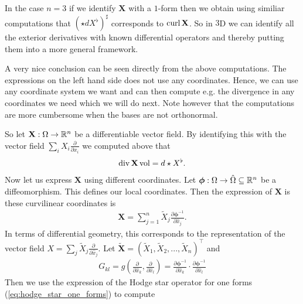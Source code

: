 \documentclass[../master_thesis.tex]{subfiles}
\begin{document}
In the case $n=3$ if we identify $\mathbf{X}$ with a $1$-form then 
we obtain using similiar computations
that $(\star d X^\flat)^\sharp$ corresponds to  $\mathbf{\operatorname{curl}} \,\mathbf{X}$.
So in $3$D we can identify all the exterior derivatives with known differential
operators and thereby putting them into a more general framework.

A very nice conclusion can be seen directly from the above computations. The 
expressions on the left hand side does not use any coordinates. Hence, 
we can use any coordinate system we want and can then compute e.g. the 
divergence in any coordinates we need which we will do next. Note however that the computations are
more cumbersome when the bases are not orthonormal.

So let $\mathbf{X}: \Omega \rightarrow \mathbb{R}^n$ be a differentiable vector field. By 
identifying this with the vector field $\sum_i X_i \frac{\partial}{\partial x_i}
$ we computed above that 
\begin{align*}
    \operatorname{div} \mathbf{X} \operatorname{vol} = d \star X^\flat.
\end{align*}
Now let us express $\mathbf{X}$ using different coordinates. 
Let $\bm{\phi}: \Omega \rightarrow \hat{\Omega} \subseteq \mathbb{R}^n$ be a diffeomorphism. 
This defines our local coordinates. Then the expression of $\mathbf{X}$ is
these curvilinear coordinates is
\begin{align*}
    \mathbf{X} = \sum_{j=1}^n \tilde{X}_j 
        \frac{\partial \bm{\phi}^{-1}}{\partial \hat{x}_j}.
\end{align*}
In terms of differential geometry, this corresponds to the representation of the vector field 
$X = \sum_j \tilde{X}_j \frac{\partial}{\partial \hat{x}_j}$. 
Let $\tilde{\mathbf{X}} = (\tilde{X}_1, \tilde{X}_2, ..., \tilde{X}_n)^\top$ 
and 
\begin{align*}
    G_{kl} = g(\frac{\partial}{\partial \hat{x}_k}, \frac{\partial}{\partial \hat{x}_l})
        = \frac{\partial \bm{\phi}^{-1}}{\partial \hat{x}_k} \cdot 
            \frac{\partial \bm{\phi}^{-1}}{\partial \hat{x}_l}
\end{align*}
Then we use the expression of the Hodge star operator 
for one forms (\ref{eq:hodge_star_one_forms}) to compute
\end{document}
